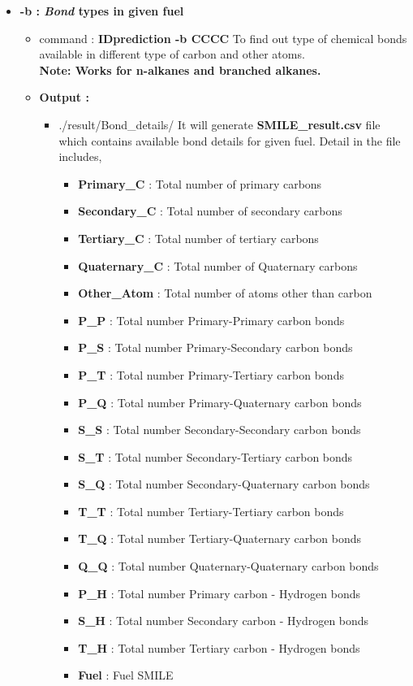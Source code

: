 \documentclass[12pt]{article}
\begin{document}
\begin{itemize}[wide = 0pt, labelwidth = 1.3333em, labelsep = 0.3333em, leftmargin = \dimexpr{} + \relax ]
		\newpage
			\item \textbf{-b : \textit{Bond} types in given fuel} \\
			\begin{itemize}
				\item command : \textbf{IDprediction -b CCCC} 
				\subitem To find out type of chemical bonds available in different type of carbon and other atoms. \\
			\textbf{Note: Works for n-alkanes and branched alkanes.}
				\item \textbf{Output :}
				\begin{itemize}
						\item ./result/Bond\_details/
						\subitem It will generate \textbf{SMILE\_result.csv} file which contains available
						bond details for given fuel. Detail in the file includes, 
						\begin{itemize}
							\item  \textbf{Primary\_C} : Total number of primary carbons 
							\item  \textbf{Secondary\_C} : Total number of secondary carbons 
							\item  \textbf{Tertiary\_C} : Total number of tertiary carbons 
							\item  \textbf{Quaternary\_C} : Total number of Quaternary carbons 
							\item  \textbf{Other\_Atom} : Total number of atoms other than carbon 
							\item  \textbf{P\_P} : Total number Primary-Primary carbon bonds 
							\item  \textbf{P\_S} : Total number Primary-Secondary carbon bonds 
							\item  \textbf{P\_T} : Total number Primary-Tertiary carbon bonds 
							\item  \textbf{P\_Q} : Total number Primary-Quaternary carbon bonds 
							\item  \textbf{S\_S} : Total number Secondary-Secondary carbon bonds 
							\item  \textbf{S\_T} : Total number Secondary-Tertiary carbon bonds  
							\item  \textbf{S\_Q} : Total number Secondary-Quaternary carbon bonds 
							\item  \textbf{T\_T} : Total number Tertiary-Tertiary carbon bonds 
							\item  \textbf{T\_Q} : Total number Tertiary-Quaternary carbon bonds 
							\item  \textbf{Q\_Q} : Total number Quaternary-Quaternary carbon bonds 
							\item  \textbf{P\_H} : Total number Primary carbon - Hydrogen bonds 
							\item  \textbf{S\_H} : Total number Secondary carbon - Hydrogen bonds 
							\item  \textbf{T\_H} : Total number Tertiary carbon - Hydrogen bonds 
							\item  \textbf{Fuel} : Fuel SMILE \\
						

\end{itemize}
\end{itemize}
\end{itemize}
\end{itemize}
\end{document}
